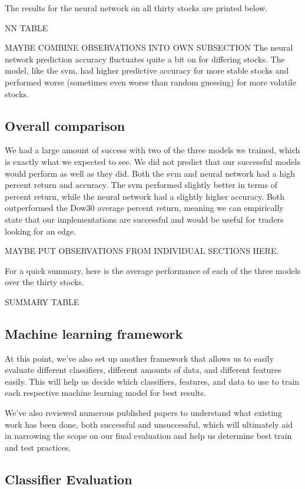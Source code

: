 \documentclass{article}
\begin{document}
The results for the neural network on all thirty stocks are printed below.

NN TABLE

MAYBE COMBINE OBSERVATIONS INTO OWN SUBSECTION
The neural network prediction accuracy fluctuates quite a bit on for differing stocks. The model, like the svm, had higher predictive accuracy for more stable stocks and performed worse (sometimes even worse than random guessing) for more volatile stocks.

\subsection{Overall comparison}
We had a large amount of success with two of the three models we trained, which is exactly what we expected to see. We did not predict that our successful models would perform as well as they did. Both the svm and neural network had a high percent return and accuracy. The svm performed slightly better in terms of percent return, while the neural network had a slightly higher accuracy. Both outperformed the Dow30 average percent return, meaning we can empirically state that our implementations are successful and would be useful for traders looking for an edge.

MAYBE PUT OBSERVATIONS FROM INDIVIDUAL SECTIONS HERE.

For a quick summary, here is the average performance of each of the three models over the thirty stocks.

SUMMARY TABLE

\subsection{Machine learning framework}

At this point, we've also set up another framework that allows us to easily evaluate different classifiers, different amounts of data, and different features easily. This will help us decide which classifiers, features, and data to use to train each respective machine learning model for best results.

We've also reviewed numerous published papers to understand what existing work has been done, both successful and unsuccessful, which will ultimately aid in narrowing the scope on our final evaluation and help us determine best train and test practices.

\subsection{Classifier Evaluation}
\end{document}
